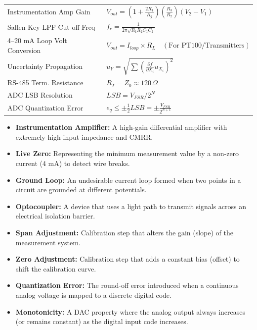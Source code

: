 \documentclass[12pt,a4paper]{article}
\renewcommand{\arraystretch}{1.45}
\begin{document}
\begin{tcolorbox}[formulabox, title={\textbf{Key Formulas at a Glance}}]
\renewcommand{\arraystretch}{1.35}
\begin{tabularx}{\linewidth}{B{5.2cm} X}
Instrumentation Amp Gain & $V_{out} = \left(1 + \frac{2R_1}{R_g}\right)\left(\frac{R_3}{R_2}\right)(V_2 - V_1)$ \\[4pt]
Sallen-Key LPF Cut-off Freq & $f_c = \frac{1}{2\pi \sqrt{R_1 R_2 C_1 C_2}}$ \\[4pt]
4--20 mA Loop Volt Conversion & $V_{out} = I_{loop} \times R_L \quad (\text{For PT100/Transmitters})$ \\[4pt]
Uncertainty Propagation & $u_Y = \sqrt{\sum \left(\frac{\partial f}{\partial X_i} u_{X_i}\right)^2}$ \\[4pt]
RS-485 Term. Resistance & $R_T = Z_0 \approx 120\,\Omega$ \\[4pt]
ADC LSB Resolution & $LSB = V_{FSR} / 2^N$ \\[4pt]
ADC Quantization Error & $e_q \le \pm \frac{1}{2} LSB = \pm \frac{V_{FSR}}{2^{N+1}}$ \\
\end{tabularx}
\end{tcolorbox}

\begin{tcolorbox}[defbox, title={\textbf{One-Line Definitions}}]
\begin{itemize}[leftmargin=*, itemsep=2pt, topsep=0pt]
  \item \textbf{Instrumentation Amplifier:} A high-gain differential amplifier with extremely high input impedance and CMRR.
  \item \textbf{Live Zero:} Representing the minimum measurement value by a non-zero current (4 mA) to detect wire breaks.
  \item \textbf{Ground Loop:} An undesirable current loop formed when two points in a circuit are grounded at different potentials.
  \item \textbf{Optocoupler:} A device that uses a light path to transmit signals across an electrical isolation barrier.
  \item \textbf{Span Adjustment:} Calibration step that alters the gain (slope) of the measurement system.
  \item \textbf{Zero Adjustment:} Calibration step that adds a constant bias (offset) to shift the calibration curve.
  \item \textbf{Quantization Error:} The round-off error introduced when a continuous analog voltage is mapped to a discrete digital code.
  \item \textbf{Monotonicity:} A DAC property where the analog output always increases (or remains constant) as the digital input code increases.
\end{itemize}
\end{tcolorbox}
\end{document}
